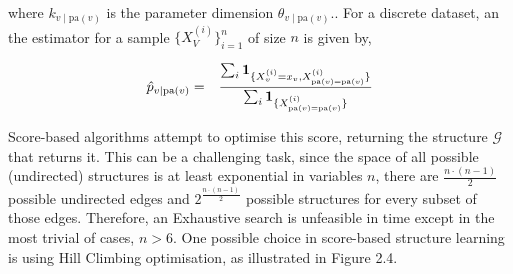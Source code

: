 where $k_{v\mid \text{pa}(v)}$ is the parameter dimension $\theta_{v\mid \text{pa}(v)}.$. For a discrete dataset, an the estimator for a sample $\{X_V^{(i)}\}_{i=1}^n$ of size $n$ is given by,

\begin{eqnarray*}
\hat p_{v|\text{pa}(v)} &=&
    {\sum_i \mathbf 1_{\{X^{(i)}_v=x_v, X^{(i)}_{\text{pa}(v)=\text{pa}(v)}\}}\over \sum_i \mathbf 1_{\{X^{(i)}_{\text{pa}(v)=\text{pa}(v)}\}}}
\end{eqnarray*}

Score-based algorithms attempt to optimise this score, returning the structure $\mathcal{G}$ that returns it. This can be a challenging task, since the space of all possible (undirected) structures is at least exponential in variables $n$, there are $\frac{n \cdot (n-1)}{2}$ possible undirected edges and $2^{\frac{n \cdot (n-1)}{2}}$ possible structures for every subset of those edges. Therefore, an Exhaustive search is unfeasible in time except in the most trivial of cases, $n > 6$. One possible choice in score-based structure learning is using Hill Climbing optimisation, as illustrated in Figure 2.4. \\

